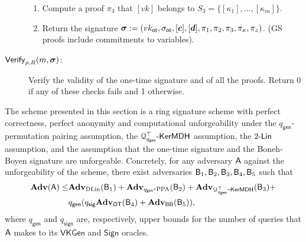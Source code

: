 \begin{description}
\begin{enumerate}
\item Compute a proof $\pi_3$ that $[vk]$ belongs to $S_3=\{[\kappa_1],\ldots,[\kappa_m]\}$.
\item Return the signature ${\boldsymbol \sigma}:=(vk_\mathsf{ot},\sigma_\mathsf{ot},[{\boldsymbol{c}}],[{\boldsymbol{d}}],\pi_1,\pi_2,\pi_3,\pi_\kappa,\pi_z)$. (GS proofs include commitments to variables).
\end{enumerate}
\item[$\mathsf{Verify}_{\rho,R}(m,{\boldsymbol \sigma})$:] Verify the validity of the one-time signature and of all the proofs. Return 0 if any of these checks fails and 1 otherwise.
\end{description}

\begin{theorem}
The scheme presented in this section is a ring signature scheme
with perfect correctness, perfect anonymity and computational unforgeability under the
$q_\mathsf{gen}$-permutation pairing assumption, the $\mathcal{Q}_{q_\mathsf{gen}}^\top\mbox{-}\mathsf{KerMDH}$ assumption, the $2\mbox{-}\mathsf{Lin}$ assumption, and the assumption
that the one-time signature and the Boneh-Boyen signature are unforgeable.
Concretely, for any adversary $\mathsf{A}$ against the unforgeability of the scheme, there exist adversaries $\mathsf{B}_1,\mathsf{B}_2,\mathsf{B}_3,\mathsf{B}_4,\mathsf{B}_5$ such that
\begin{align*}
\mathbf{Adv}(\mathsf{A})\leq &\mathbf{Adv}_{\mathrm{DLin}}(\mathsf{B}_1)+\mathbf{Adv}_{q_\mathsf{gen}\mbox{-}\mathrm{PPA}}(\mathsf{B}_2)+\mathbf{Adv}_{\mathcal{Q}^\top_{q_\mathsf{gen}}\mbox{-}\mathsf{KerMDH}}(\mathsf{B}_3)+\\
&q_\mathsf{gen}(q_\mathsf{sig}\mathbf{Adv}_{\mathsf{OT}}(\mathsf{B}_4)+\mathbf{Adv}_{\mathsf{BB}}(\mathsf{B}_5)),
\end{align*}
where $q_\mathsf{gen}$ and $q_\mathsf{sign}$ are, respectively, upper bounds for the number of queries that $\mathsf{A}$ makes to its $\mathsf{VKGen}$ and $\mathsf{Sign}$ oracles.
\end{theorem}
